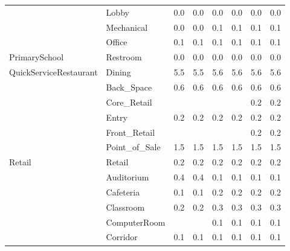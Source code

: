 \begin{center}
\begin{longtable}{p{1.25in}p{1in}p{0.5in}p{0.5in}p{0.5in}p{0.5in}p{0.5in}p{0.5in}}
                                   & Lobby                                & 0.0     & 0.0     & 0.0    & 0.0   & 0.0   & 0.0    \\
                                   & Mechanical                           & 0.0     & 0.0     & 0.1    & 0.1   & 0.1   & 0.1    \\
                                   & Office                               & 0.1     & 0.1     & 0.1    & 0.1   & 0.1   & 0.1    \\
PrimarySchool                      & Restroom                             & 0.0     & 0.0     & 0.0    & 0.0   & 0.0   & 0.0    \\
QuickServiceRestaurant             & Dining                               & 5.5     & 5.5     & 5.6    & 5.6   & 5.6   & 5.6    \\
                                   & Back\_Space                          & 0.6     & 0.6     & 0.6    & 0.6   & 0.6   & 0.6    \\
                                   & Core\_Retail                         &         &         &        &       & 0.2   & 0.2    \\
                                   & Entry                                & 0.2     & 0.2     & 0.2    & 0.2   & 0.2   & 0.2    \\
                                   & Front\_Retail                        &         &         &        &       & 0.2   & 0.2    \\
                                   & Point\_of\_Sale                      & 1.5     & 1.5     & 1.5    & 1.5   & 1.5   & 1.5    \\
Retail                             & Retail                               & 0.2     & 0.2     & 0.2    & 0.2   & 0.2   & 0.2    \\
                                   & Auditorium                           & 0.4     & 0.4     & 0.1    & 0.1   & 0.1   & 0.1    \\
                                   & Cafeteria                            & 0.1     & 0.1     & 0.2    & 0.2   & 0.2   & 0.2    \\
                                   & Classroom                            & 0.2     & 0.2     & 0.3    & 0.3   & 0.3   & 0.3    \\
                                   & ComputerRoom                         &         &         & 0.1    & 0.1   & 0.1   & 0.1    \\
                                   & Corridor                             & 0.1     & 0.1     & 0.1    & 0.1   & 0.1   & 0.1    \\

\end{longtable}
\end{center}

